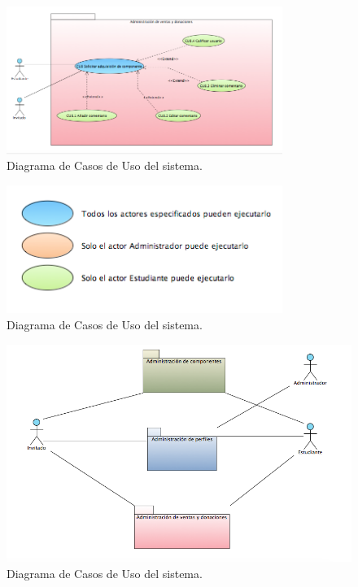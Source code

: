 \documentclass[oneside,10pt]{book}
\begin{document}
	\begin{figure}[htbp!]
		\centering
			\includegraphics[width=0.8\textwidth]{images/CasosDeUso3}
		\caption{Diagrama de Casos de Uso del sistema.}
	\end{figure}
	
	\begin{figure}[htbp!]
		\centering
			\includegraphics[width=0.8\textwidth]{images/CasosDeUso4}
		\caption{Diagrama de Casos de Uso del sistema.}
	\end{figure}
	
	\begin{figure}[htbp!]
		\centering
			\includegraphics[width=1\textwidth]{images/CasosDeUso5}
		\caption{Diagrama de Casos de Uso del sistema.}
	\end{figure}
	
\end{document}
